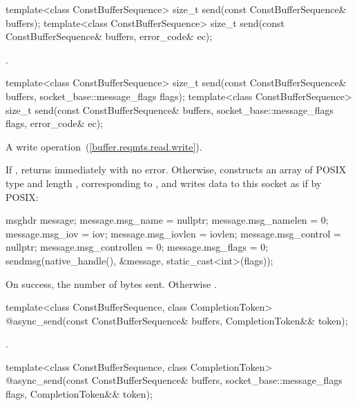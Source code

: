 \begin{itemdecl}
template<class ConstBufferSequence>
  size_t send(const ConstBufferSequence& buffers);
template<class ConstBufferSequence>
  size_t send(const ConstBufferSequence& buffers, error_code& ec);
\end{itemdecl}

\begin{itemdescr}
\pnum
\returns {}.
\end{itemdescr}

\begin{itemdecl}
template<class ConstBufferSequence>
  size_t send(const ConstBufferSequence& buffers,
              socket_base::message_flags flags);
template<class ConstBufferSequence>
  size_t send(const ConstBufferSequence& buffers,
              socket_base::message_flags flags, error_code& ec);
\end{itemdecl}

\begin{itemdescr}
\pnum
A write operation~(\ref{buffer.reqmts.read.write}).

\pnum
\effects If , returns immediately with no error. Otherwise, constructs an array  of POSIX type  and length , corresponding to , and writes data to this socket as if by POSIX: 
\begin{codeblock}
msghdr message;
message.msg_name = nullptr;
message.msg_namelen = 0;
message.msg_iov = iov;
message.msg_iovlen = iovlen;
message.msg_control = nullptr;
message.msg_controllen = 0;
message.msg_flags = 0;
sendmsg(native_handle(), &message, static_cast<int>(flags));
\end{codeblock}


\pnum
\returns On success, the number of bytes sent. Otherwise .
\end{itemdescr}

\begin{itemdecl}
template<class ConstBufferSequence, class CompletionToken>
  @\DEDUCED@ async_send(const ConstBufferSequence& buffers, CompletionToken&& token);
\end{itemdecl}

\begin{itemdescr}
\pnum
\returns {}.
\end{itemdescr}

\begin{itemdecl}
template<class ConstBufferSequence, class CompletionToken>
  @\DEDUCED@ async_send(const ConstBufferSequence& buffers,
                     socket_base::message_flags flags,
                     CompletionToken&& token);
\end{itemdecl}

